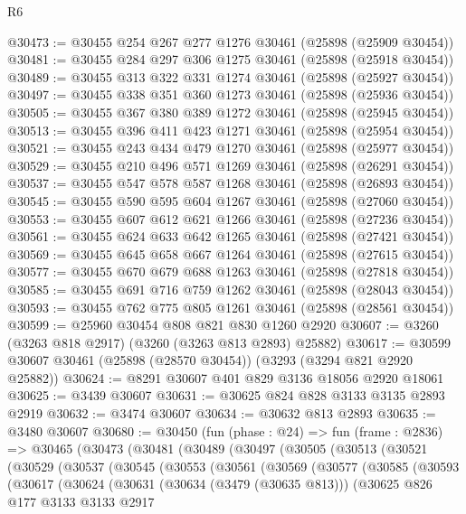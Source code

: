\begin{lexlean}{R6}
\begin{coremodule}
@30473 := @30455 @254 @267 @277 @1276 @30461 (@25898 (@25909 @30454))
@30481 := @30455 @284 @297 @306 @1275 @30461 (@25898 (@25918 @30454))
@30489 := @30455 @313 @322 @331 @1274 @30461 (@25898 (@25927 @30454))
@30497 := @30455 @338 @351 @360 @1273 @30461 (@25898 (@25936 @30454))
@30505 := @30455 @367 @380 @389 @1272 @30461 (@25898 (@25945 @30454))
@30513 := @30455 @396 @411 @423 @1271 @30461 (@25898 (@25954 @30454))
@30521 := @30455 @243 @434 @479 @1270 @30461 (@25898 (@25977 @30454))
@30529 := @30455 @210 @496 @571 @1269 @30461 (@25898 (@26291 @30454))
@30537 := @30455 @547 @578 @587 @1268 @30461 (@25898 (@26893 @30454))
@30545 := @30455 @590 @595 @604 @1267 @30461 (@25898 (@27060 @30454))
@30553 := @30455 @607 @612 @621 @1266 @30461 (@25898 (@27236 @30454))
@30561 := @30455 @624 @633 @642 @1265 @30461 (@25898 (@27421 @30454))
@30569 := @30455 @645 @658 @667 @1264 @30461 (@25898 (@27615 @30454))
@30577 := @30455 @670 @679 @688 @1263 @30461 (@25898 (@27818 @30454))
@30585 := @30455 @691 @716 @759 @1262 @30461 (@25898 (@28043 @30454))
@30593 := @30455 @762 @775 @805 @1261 @30461 (@25898 (@28561 @30454))
@30599 := @25960 @30454 @808 @821 @830 @1260 @2920
@30607 := @3260 (@3263 @818 @2917) (@3260 (@3263 @813 @2893) @25882)
@30617 := @30599 @30607 @30461 (@25898 (@28570 @30454)) (@3293 (@3294 @821 @2920 @25882))
@30624 := @8291 @30607 @401 @829 @3136 @18056 @2920 @18061
@30625 := @3439 @30607
@30631 := @30625 @824 @828 @3133 @3135 @2893 @2919
@30632 := @3474 @30607
@30634 := @30632 @813 @2893
@30635 := @3480 @30607
@30680 := @30450
    (fun (phase : @24) =>
    fun (frame : @2836) =>
    @30465
      (@30473
        (@30481
          (@30489
            (@30497
              (@30505
                (@30513
                  (@30521
                    (@30529
                      (@30537
                        (@30545
                          (@30553
                            (@30561
                              (@30569
                                (@30577
                                  (@30585
                                    (@30593
                                      (@30617
                                        (@30624
                                          (@30631
                                            (@30634 (@3479 (@30635 @813)))
                                            (@30625
                                              @826
                                              @177
                                              @3133
                                              @3133
                                              @2917

\end{coremodule}
\end{lexlean}
